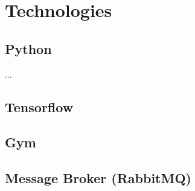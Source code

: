 \section{Technologies}



\subsection{Python}

...

\subsection{Tensorflow}

\subsection{Gym}

\subsection{Message Broker (RabbitMQ)}

